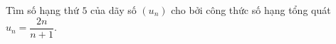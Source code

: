 \begin{ex}
Tìm số hạng thứ $5$ của dãy số $(u_n)$ cho bởi công thức số hạng tổng quát $u_n=\dfrac{2n}{n+1}$.
\end{ex}
